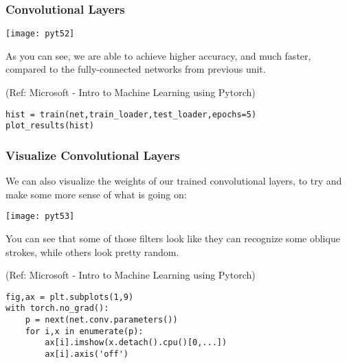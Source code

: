 \begin{frame}[fragile] \frametitle{Convolutional Layers}



\begin{center}
\texttt{[image: pyt52]}
\end{center}


As you can see, we are able to achieve higher accuracy, and much faster, compared to the fully-connected networks from previous unit.

\tiny{(Ref: Microsoft - Intro to Machine Learning using Pytorch)}

\begin{lstlisting}
hist = train(net,train_loader,test_loader,epochs=5)
plot_results(hist)
\end{lstlisting}

\end{frame}

\begin{frame}[fragile] \frametitle{Visualize Convolutional Layers}

We can also visualize the weights of our trained convolutional layers, to try and make some more sense of what is going on:



\begin{center}
\texttt{[image: pyt53]}
\end{center}


You can see that some of those filters look like they can recognize some oblique strokes, while others look pretty random.

\tiny{(Ref: Microsoft - Intro to Machine Learning using Pytorch)}


\begin{lstlisting}
fig,ax = plt.subplots(1,9)
with torch.no_grad():
    p = next(net.conv.parameters())
    for i,x in enumerate(p):
        ax[i].imshow(x.detach().cpu()[0,...])
        ax[i].axis('off')
\end{lstlisting}
\end{frame}


